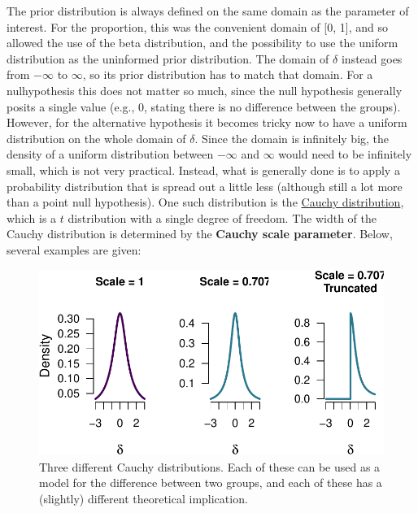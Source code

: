 \documentclass[
  letterpaper,
  DIV=11,
  numbers=noendperiod]{scrreprt}
\begin{document}
The prior distribution is always defined on the same domain as the
parameter of interest. For the proportion, this was the convenient
domain of {[}0, 1{]}, and so allowed the use of the beta distribution,
and the possibility to use the uniform distribution as the uninformed
prior distribution. The domain of \(\delta\) instead goes from
\(-\infty\) to \(\infty\), so its prior distribution has to match that
domain. For a nulhypothesis this does not matter so much, since the null
hypothesis generally posits a single value (e.g., 0, stating there is no
difference between the groups). However, for the alternative hypothesis
it becomes tricky now to have a uniform distribution on the whole domain
of \(\delta\). Since the domain is infinitely big, the density of a
uniform distribution between \(-\infty\) and \(\infty\) would need to be
infinitely small, which is not very practical. Instead, what is
generally done is to apply a probability distribution that is spread out
a little less (although still a lot more than a point null hypothesis).
One such distribution is the
\href{https://en.wikipedia.org/wiki/Cauchy_distribution}{Cauchy
distribution}, which is a \(t\) distribution with a single degree of
freedom. The width of the Cauchy distribution is determined by the
\textbf{Cauchy scale parameter}. Below, several examples are given:

\begin{figure}

{\centering \includegraphics[width=1\textwidth,height=\textheight]{05-more-tests_files/figure-pdf/three-cauchy-dists-1.pdf}

}

\caption{Three different Cauchy distributions. Each of these can be used
as a model for the difference between two groups, and each of these has
a (slightly) different theoretical implication.}

\end{figure}
\end{document}
